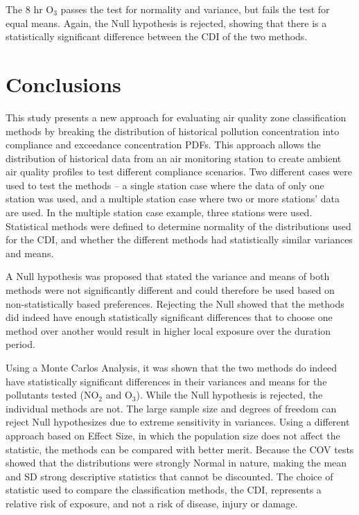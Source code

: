 The 8 hr O$_{3}$ passes the test for normality and variance, but fails the test for equal means. Again, the Null hypothesis is rejected, showing that there is a statistically significant difference between the CDI of the two methods.
%
\section{Conclusions}

This study presents a new approach for evaluating air quality zone classification methods by breaking the distribution of historical pollution concentration into compliance and exceedance concentration PDFs. This approach allows the distribution of historical data from an air monitoring station to create ambient air quality profiles to test different compliance scenarios. Two different cases were used to test the methods – a single station case where the data of only one station was used, and a multiple station case where two or more stations’ data are used. In the multiple station case example, three stations were used. Statistical methods were defined to determine normality of the distributions used for the CDI, and whether the different methods had statistically similar variances and means.

A Null hypothesis was proposed that stated the variance and means of both methods were not significantly different and could therefore be used based on non-statistically based preferences. Rejecting the Null showed that the methods did indeed have enough statistically significant differences that to choose one method over another would result in higher local exposure over the duration period. 

Using a Monte Carlos Analysis, it was shown that the two methods do indeed have statistically significant differences in their variances and means for the pollutants tested (NO$_{2}$ and O$_{3}$). While the Null hypothesis is rejected, the individual methods are not. The large sample size and degrees of freedom can reject Null hypothesizes due to extreme sensitivity in variances. Using a different approach based on Effect Size, in which the population size does not affect the statistic, the methods can be compared with better merit. Because the COV tests showed that the distributions were strongly Normal in nature, making the mean and SD strong descriptive statistics that cannot be discounted. The choice of statistic used to compare the classification methods, the CDI, represents a relative risk of exposure, and not a risk of disease, injury or damage. 

